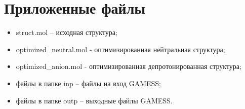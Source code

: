 \section{Приложенные файлы}
\begin{itemize}
    \item struct.mol – исходная структура;
    \item optimized\_neutral.mol - оптимизированная нейтральная структура;
    \item optimized\_anion.mol - оптимизированная депротонированная структура;
    \item файлы в папке inp – файлы на вход GAMESS;
    \item файлы в папке outp – выходные файлы GAMESS.
\end{itemize}{}